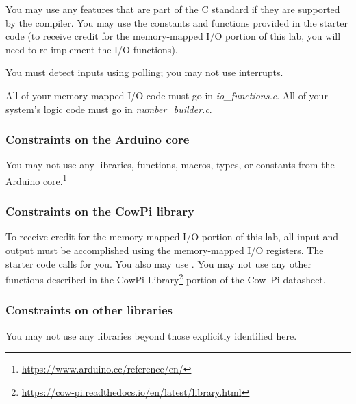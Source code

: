 You may use any features that are part of the C standard if they are supported by the compiler.
You may use the constants and functions provided in the starter code
(to receive credit for the memory-mapped I/O portion of this lab, you will need to re-implement the I/O functions).

You must detect inputs using polling;
you may not use interrupts.

All of your memory-mapped I/O code must go in \textit{io\_functions.c}.
All of your system's logic code must go in \textit{number\_builder.c}.

\subsubsection{Constraints on the Arduino core}

You may not use any libraries, functions, macros, types, or constants from the Arduino core.\footnote{\url{https://www.arduino.cc/reference/en/}}


\subsubsection{Constraints on the CowPi library}

To receive credit for the memory-mapped I/O portion of this lab, all input and output must be accomplished using the memory-mapped I/O registers.
The starter code calls  for you.
You also may use \href{https://cow-pi.readthedocs.io/en/latest/CowPi/inputs.html#debouncing}{}.
You may not use any other functions described in the CowPi Library\footnote{\url{https://cow-pi.readthedocs.io/en/latest/library.html}} portion of the Cow~Pi datasheet.

\subsubsection{Constraints on other libraries}

You may not use any libraries beyond those explicitly identified here.
